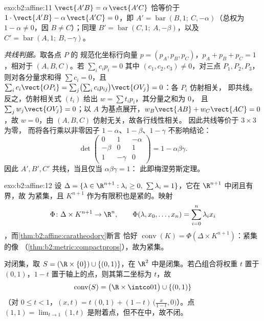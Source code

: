 \begin{solution}{exo:b2:affine:11}
$\vect{A'B} = \alpha\,\vect{A'C}$ 恰等价于 $1\cdot
\vect{A'B} - \alpha\,\vect{A'C} = 0$，即 $A' =
\operatorname{bar}(B, 1;\ C, -\alpha)$（总权为 $1 -
\alpha \neq 0$，因 $B \neq C$）；同理 $B' =
\operatorname{bar}(C, 1;\ A, -\beta)$，以及 $C' =
\operatorname{bar}(A, 1;\ B, -\gamma)$。

\emph{共线判据。}取各点 $P$ 的
规范化坐标行向量 $p = (p_A, p_B, p_C)$，$p_A + p_B +
p_C = 1$，相对于 $(A, B, C)$。若 $\sum_i c_i p_i = 0$
其中 $(c_1, c_2, c_3) \neq 0$，对三点 $P_1, P_2,
P_3$，则对各分量求和得 $\sum c_i = 0$，且
$\sum_i c_i \vect{OP_i} = \sum_j \bigl(\sum_i
c_ip_{ij}\bigr)\vect{OV_j} = 0$：各 $P_i$ 仿射相关，
即共线。反之，仿射相关式
$(t_i)$ 给出 $w = \sum t_ip_i$，其分量之和为 $0$，
且 $\sum_j w_j\vect{OV_j} = 0$；以 $A$ 为基点展开，$w_B
\vect{AB} + w_C\vect{AC} = 0$，故 $w = 0$，由
$(A, B, C)$ 仿射无关，故各行线性相关。
因此共线等价于 $3 \times 3$ 为零，
而将各行乘以非零因子 $1 - \alpha$、$1 -
\beta$、$1 - \gamma$ 不影响结论：
\[
\det\begin{pmatrix} 0 & 1 & -\alpha\\ -\beta & 0 & 1\\ 1 &
-\gamma & 0\end{pmatrix}
= 1 - \alpha\beta\gamma .
\]
因此 $A', B', C'$ 共线，当且仅当 $\alpha\beta\gamma = 1$：
此即梅涅劳斯定理。
\end{solution}

\begin{solution}{exo:b2:affine:12}
设 $\Delta = \{\lambda \in \R^{n+1} : \lambda_i \geq 0,\
\sum\lambda_i = 1\}$，它在 $\R^{n+1}$ 中闭且有界，故
为紧集，且 $K^{n+1}$ 作为有限积也是紧的。映射
\[
\Phi \colon \Delta \times K^{n+1} \to \R^n, \qquad
\Phi(\lambda, x_0, \dots, x_n) = \sum_{i=0}^n \lambda_i x_i
\]
，而\cref{thm:b2:affine:caratheodory}断言
恰好 $\operatorname{conv}(K) = \Phi(\Delta \times
K^{n+1})$：紧集的像
（\cref{thm:b2:metric:compactprops}），故为紧集。

对闭集，取 $S = (\R \times \{0\}) \cup \{(0,
1)\}$，在 $\R^2$ 中是闭集。若凸组合将权重
$t$ 置于 $(0,1)$，$1 - t$ 置于轴上的点，则其第二坐标为
$t$，故
\[
\operatorname{conv}(S) = \bigl(\R \times \intco01\bigr) \cup
\{(0,1)\}
\]
（对 $0 \leq t < 1$，$(x, t) = t\,(0,1) + (1-t)\,\bigl(\tfrac
x{1-t}, 0\bigr)$）。点 $(1, 1) = \lim_{t \to 1}(1, t)$
是附着点，但不在中，故不闭。
\end{solution}

